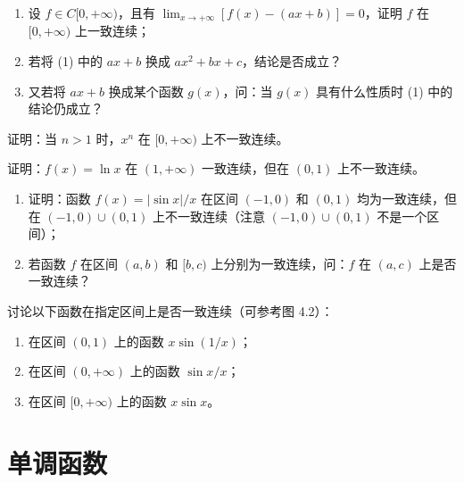 \begin{xexercise}[5]
\begin{enumerate}[label=(\arabic*)]
    \item 设 $f\in C[0,+\infty)$，且有 $\lim_{x\to+\infty}[f(x)-(ax+b)]=0$，证明 $f$ 在 $[0,+\infty)$ 上一致连续；
    \item 若将 (1) 中的 $ax+b$ 换成 $ax^2+bx+c$，结论是否成立？
    \item 又若将 $ax+b$ 换成某个函数 $g(x)$，问：当 $g(x)$ 具有什么性质时 (1) 中的结论仍成立？
  \end{enumerate}
\end{xexercise}

\begin{xexercise}[6]
证明：当 $n>1$ 时，$x^n$ 在 $[0,+\infty)$ 上不一致连续。
\end{xexercise}

\begin{xexercise}[7]
证明：$f(x)=\ln x$ 在 $(1,+\infty)$ 一致连续，但在 $(0,1)$ 上不一致连续。
\end{xexercise}

\begin{xexercise}[8]
\begin{enumerate}[label=(\arabic*)]
    \item 证明：函数 $f(x)=|\sin x|/x$ 在区间 $(-1,0)$ 和 $(0,1)$ 均为一致连续，但在 $(-1,0)\cup(0,1)$ 上不一致连续（注意 $(-1,0)\cup(0,1)$ 不是一个区间）；
    \item 若函数 $f$ 在区间 $(a,b)$ 和 $[b,c)$ 上分别为一致连续，问：$f$ 在 $(a,c)$ 上是否一致连续？
  \end{enumerate}
\end{xexercise}

\begin{xexercise}[9]
讨论以下函数在指定区间上是否一致连续（可参考图 4.2）：
  \begin{enumerate}[label=(\arabic*)]
    \item 在区间 $(0,1)$ 上的函数 $x\sin(1/x)$；
    \item 在区间 $(0,+\infty)$ 上的函数 $\sin x/x$；
    \item 在区间 $[0,+\infty)$ 上的函数 $x\sin x$。
  \end{enumerate}
\end{xexercise}

\section{单调函数}

